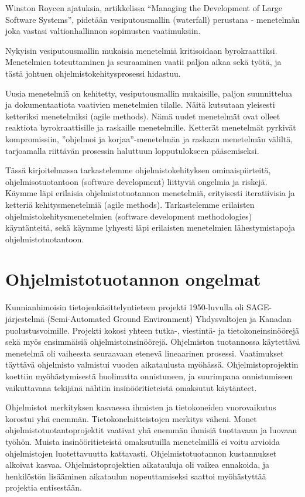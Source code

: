 \documentclass[finnish]{tktltiki2}
\theoremstyle{definition}
\theoremstyle{remark}
\begin{document}
Winston Roycen ajatuksia, artikkelissa “Managing the Development of Large Software Systems”, pidetään vesiputousmallin (waterfall) perustana - menetelmän joka vastasi valtionhallinnon sopimusten vaatimuksiin\cite{LAB03}.

Nykyisin vesiputousmallin mukaisia menetelmiä kritisoidaan byrokraattiksi. Menetelmien toteuttaminen ja seuraaminen vaatii paljon aikaa sekä työtä, ja tästä johtuen ohjelmistokehitysprosessi hidastuu\cite{FOW01a}.

Uusia menetelmiä on kehitetty, vesiputousmallin mukaisille, paljon suunnittelua ja dokumentaatiota vaativien menetelmien tilalle. Näitä kutsutaan yleisesti ketteriksi menetelmiksi (agile methods). Nämä uudet menetelmät ovat olleet reaktiota byrokraattisille ja raskaille menetelmille. Ketterät menetelmät pyrkivät kompromissiin, ''ohjelmoi ja korjaa''-menetelmän ja raskaan menetelmän väliltä, tarjoamalla riittävän prosessin haluttuun lopputulokseen pääsemiseksi\cite{FOW01a}.

Tässä kirjoitelmassa tarkastelemme ohjelmistokehityksen ominaispiirteitä, ohjelmisotuotantoon (software develop\-ment) liittyviä ongelmia ja riskejä. Käymme läpi erilaisia ohjelmistotuotannon menetelmiä, erityisesti iteratiivisia ja ketteriä kehitysmenetelmiä (agile methods). Tarkastelemme erilaisten ohjelmistokehitysmenetelmien (software develop\-ment methodologies) käyntänteitä, sekä käymme lyhyesti läpi erilaisten menetelmien lähestymistapoja ohjelmistotuotantoon.

\section{Ohjelmistotuotannon ongelmat}

Kunnianhimoisin tietojenkäsittelyntieteen projekti 1950-luvulla oli SAGE-järjestelmä (Semi-Automated Ground Environment) Yhdysvaltojen ja Kanadan puolustusvoimille. Projekti kokosi yhteen tutka-, viestintä- ja tietokoneinsinöörejä sekä myös ensimmäisiä ohjelmistoinsinöörejä. Ohjelmiston tuotannossa käytettävä menetelmä oli vaiheesta seuraavaan etenevä lineaarinen prosessi. Vaatimukset täyttävä ohjelmisto valmistui vuoden aikataulusta myöhässä. Ohjelmistoprojektin koettiin myöhästymisestä huolimatta onnistuneen, ja suurimpana onnistumiseen vaikuttavana tekijänä nähtiin insinööritieteistä omaksutut käytänteet\cite{BOE06}.

Ohjelmistot merkityksen kasvaessa ihmisten ja tietokoneiden vuorovaikutus korostui yhä enemmän. Tietokonelaitteistojen merkitys väheni. Monet ohjelmistotuotantoprojektit vaativat yhä enemmän ihmisiä tuottavaan ja luovaan työhön. Muista insinööritieteistä omaksutuilla menetelmillä ei voitu arvioida ohjelmistojen luotettavuutta kattavasti. Ohjelmistotuotannon kustannukset alkoivat kasvaa. Ohjelmistoprojektien aikatauluja oli vaikea ennakoida, ja henkilöstön lisääminen aikataulun nopeuttamiseksi saattoi myöhästyttää projektia entisestään\cite{BOE06}.
\end{document}
